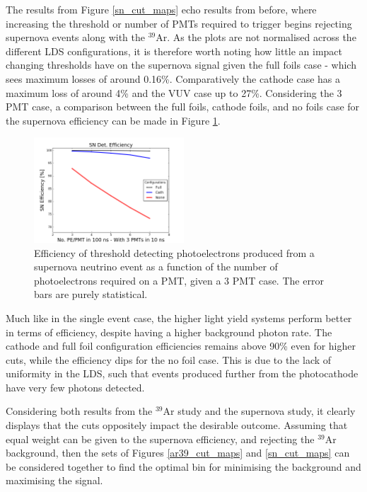 \documentclass[a4paper]{article}
\begin{document}
The results from Figure \ref{sn_cut_maps} echo results from before, where increasing the threshold or number of PMTs required to trigger begins rejecting supernova events along with the $^{39}$Ar. As the plots are not normalised across the different LDS configurations, it is therefore worth noting how little an impact changing thresholds have on the supernova signal given the full foils case - which sees maximum losses of around 0.16\%. Comparatively the cathode case has a maximum loss of around 4\% and the VUV case up to 27\%. Considering the 3 PMT case, a comparison between the full foils, cathode foils, and no foils case for the supernova efficiency  can be made in Figure \ref{sn_efficiency}. 

\begin{figure}[H]
\center
\includegraphics[width=0.5\textwidth]{updated_efficiency_labels.png}
\caption{Efficiency of threshold detecting photoelectrons produced from a supernova neutrino event as a function of the number of photoelectrons required on a PMT, given a 3 PMT case. The error bars are purely statistical.}\label{sn_efficiency}
\end{figure}

Much like in the single event case, the higher light yield systems perform better in terms of efficiency, despite having a higher background photon rate. The cathode and full foil configuration efficiencies remains above 90\% even for higher cuts, while the efficiency dips for the no foil case. This is due to the lack of uniformity in the LDS, such that events produced further from the photocathode have very few photons detected. 

Considering both results from the $^{39}$Ar study and the supernova study, it clearly displays that the cuts oppositely impact the desirable outcome. Assuming that equal weight can be given to the supernova efficiency, and rejecting the $^{39}$Ar background, then the sets of Figures \ref{ar39_cut_maps} and \ref{sn_cut_maps} can be considered together to find the optimal bin for minimising the background and maximising the signal.
\end{document}

